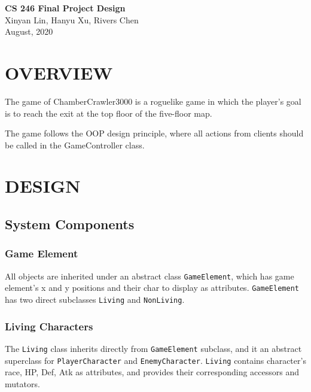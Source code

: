 \documentclass[11pt]{article}
\theoremstyle{plain} \newtheorem{theorem*}{Theorem}[subsection]
\begin{document}
\begin{center}
{\LARGE \textbf{CS 246 Final Project Design}}\\
\vspace{0.15 in}
Xinyan Lin, Hanyu Xu, Rivers Chen\\
\vspace{0.07 in}
August, 2020
\end{center}

\vspace{0.3 in}
\section{OVERVIEW}
The game of ChamberCrawler3000 is a roguelike game in which the player’s goal
is to reach the exit at the top floor of the five-floor map.  

The game follows the OOP design principle, where all actions from clients
should be called in the GameController class.  


\section{DESIGN}
\subsection{System Components}

\subsubsection{Game Element}

All objects are inherited under an abstract class \texttt{GameElement}, which
has game element's x and y positions and their char to display as attributes.
\texttt{GameElement} has two direct subclasses \texttt{Living} and
\texttt{NonLiving}.


\subsubsection{Living Characters}

The \texttt{Living} class inherits directly from \texttt{GameElement} subclass,
and it an abstract superclass for \texttt{PlayerCharacter} and
\texttt{EnemyCharacter}. \texttt{Living} contains 
character's race, HP, Def, Atk
as attributes, and provides their corresponding accessors and mutators.
\end{document}
